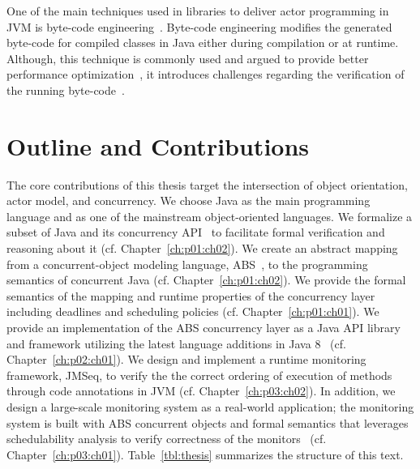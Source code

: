 One of the main techniques used in libraries to deliver actor programming in 
JVM is byte-code engineering~\cite{dahm1999byte,bruneton2002asm,asm}.
Byte-code engineering modifies the generated byte-code for compiled classes in 
Java either during compilation or at runtime.
Although, this technique is commonly used and argued to provide better 
performance optimization~\cite{vallee1999soot}, it introduces challenges 
regarding the verification of the running 
byte-code~\cite{leroy2001java,leroy2003java}.

\section{Outline and Contributions}
\label{sec:intro:contribs}

The core contributions of this thesis target the intersection of object 
orientation, actor model, and concurrency.
We choose Java as the main programming language and as one of the mainstream 
object-oriented languages. 
We formalize a subset of Java and its concurrency API~\cite{jsr166} to 
facilitate formal verification and reasoning about it (cf. Chapter~\ref{ch:p01:ch02}).
We create an abstract mapping from a concurrent-object modeling language, 
ABS~\cite{johnsen2012abs}, to the programming semantics of concurrent Java (cf. Chapter~\ref{ch:p01:ch02}). 
We provide the formal semantics of the mapping and runtime properties of 
the concurrency layer including deadlines and scheduling policies (cf. Chapter~\ref{ch:p01:ch01}).
We provide an implementation of the ABS concurrency layer as a Java API library 
and framework utilizing the latest language additions 
in Java 8~\cite{jsr335:lambda:translation} (cf. Chapter~\ref{ch:p02:ch01}).
We design and implement a runtime monitoring framework, JMSeq, to verify the
the correct ordering of execution of methods through code annotations in JVM (cf. Chapter~\ref{ch:p03:ch02}). 
In addition, we design a large-scale monitoring system as a real-world 
application; the monitoring system is built with ABS concurrent objects 
and formal semantics that leverages schedulability 
analysis to verify correctness of the monitors~\cite{fersman2007task} (cf. Chapter~\ref{ch:p03:ch01}).
Table~\ref{tbl:thesis} summarizes the structure of this text.

